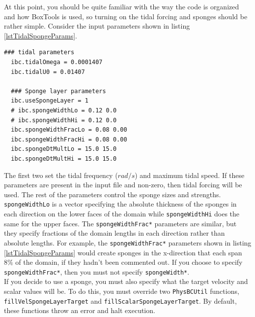 \documentclass[12pt]{article}
\begin{document}
At this point, you should be quite familiar with the way the code is organized and how BoxTools is used, so turning on the tidal forcing and sponges should be rather simple. Consider the input parameters shown in listing \ref{lstTidalSpongeParams}.
\begin{lstlisting}[label=lstTidalSpongeParams,caption={Some tidal and sponge forcing input parameters.}]
  ### tidal parameters
  ibc.tidalOmega = 0.0001407
  ibc.tidalU0 = 0.01407

  ### Sponge layer parameters
  ibc.useSpongeLayer = 1
  # ibc.spongeWidthLo = 0.12 0.0
  # ibc.spongeWidthHi = 0.12 0.0
  ibc.spongeWidthFracLo = 0.08 0.00
  ibc.spongeWidthFracHi = 0.08 0.00
  ibc.spongeDtMultLo = 15.0 15.0
  ibc.spongeDtMultHi = 15.0 15.0  
\end{lstlisting}
The first two set the tidal frequency ($rad/s$) and maximum tidal speed. If these parameters are present in the input file and non-zero, then tidal forcing will be used. The rest of the parameters control the sponge sizes and strengths. \texttt{spongeWidthLo} is a vector specifying the absolute thickness of the sponges in each direction on the lower faces of the domain while \texttt{spongeWidthHi} does the same for the upper faces. The \texttt{spongeWidthFrac*} parameters are similar, but they specify fractions of the domain lengths in each direction rather than absolute lengths. For example, the \texttt{spongeWidthFrac*} parameters shown in listing \ref{lstTidalSpongeParams} would create sponges in the x-direction that each span $8\%$ of the domain, if they hadn't been commented out. If you choose to specify \texttt{spongeWidthFrac*}, then you must not specify \texttt{spongeWidth*}.\\

If you decide to use a sponge, you must also specify what the target velocity and scalar values will be. To do this, you must override two \texttt{PhysBCUtil} functions, \texttt{fillVelSpongeLayerTarget} and \texttt{fillScalarSpongeLayerTarget}. By default, these functions throw an error and halt execution.


% 
%
% 
% 


\end{document}
